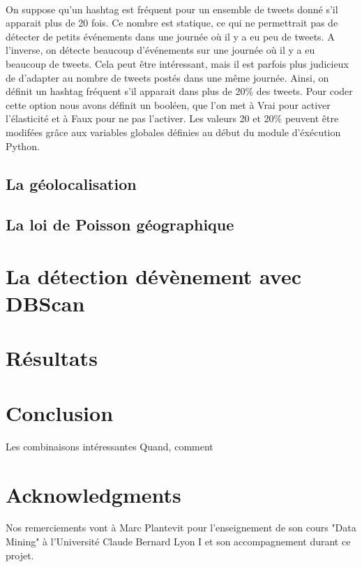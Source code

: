 \documentclass[12pt]{article}
\begin{document}
\paragraph{}
On suppose qu'un hashtag est fr\'equent pour un ensemble de tweets donn\'e s'il apparait
plus de 20 fois.
\newline
Ce nombre est statique, ce qui ne permettrait pas de d\'etecter de petits \'ev\'enements dans
une journ\'ee o\`u il y a eu peu de tweets. A l'inverse, on d\'etecte beaucoup d'\'ev\'enements sur
une journ\'ee o\`u il y a eu beaucoup de tweets.
Cela peut \^etre int\'eressant, mais il est parfois plus judicieux de d'adapter au nombre de
tweets post\'es dans une m\^eme journ\'ee. Ainsi, on d\'efinit un hashtag fr\'equent s'il apparait
dans plus de 20\% des tweets.
Pour coder cette option nous avons d\'efinit un bool\'een, que l'on met \`a Vrai pour activer
l'\'elasticit\'e et \`a Faux pour ne pas l'activer.
Les valeurs 20 et 20\% peuvent \^etre modif\'ees gr\^ace aux variables globales d\'efinies au d\'ebut du
module d'\'ex\'ecution Python.

\subsection{La g\'eolocalisation}


\subsection{La loi de Poisson g\'eographique}


\section{La d\'etection d\'ev\`enement avec DBScan}


\section{R\'esultats}



\section{Conclusion}
Les combinaisons int\'eressantes
\newline
Quand, comment


\section*{Acknowledgments}
Nos remerciements vont \`a Marc Plantevit pour l'enseignement de son cours "Data Mining" \`a l'Universit\'e Claude Bernard Lyon I et son accompagnement durant ce projet.






\appendix
\end{document}
